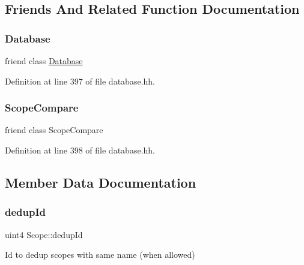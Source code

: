 \subsection{Friends And Related Function Documentation}
\mbox{\label{class_scope_a6efef52d7a939622bbc934ff6b90ffe0}} 
\subsubsection{\texorpdfstring{Database}{Database}}
{\footnotesize\ttfamily friend class \mbox{\hyperlink{class_database}{Database}}\hspace{0.3cm}{\ttfamily [friend]}}



Definition at line 397 of file database.\+hh.

\mbox{\label{class_scope_a7ec804b298dc727f18acb363664fb4f5}} 
\subsubsection{\texorpdfstring{ScopeCompare}{ScopeCompare}}
{\footnotesize\ttfamily friend class Scope\+Compare\hspace{0.3cm}{\ttfamily [friend]}}



Definition at line 398 of file database.\+hh.



\subsection{Member Data Documentation}
\mbox{\label{class_scope_a595958fb57d57650588b8400290b74a6}} 
\subsubsection{\texorpdfstring{dedupId}{dedupId}}
{\footnotesize\ttfamily uint4 Scope\+::dedup\+Id\hspace{0.3cm}{\ttfamily [protected]}}



Id to dedup scopes with same name (when allowed) 



